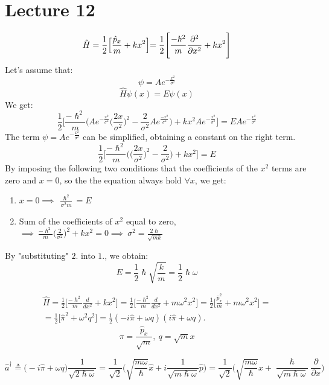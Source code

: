 \documentclass{article}
\begin{document}
\section{Lecture 12}
$$\hat{H} = \frac{1}{2} \Bigl[ \frac{\hat{p}_x}{m} + kx^2 \Bigl] = \frac{1}{2} \Biggl[ \frac{-\hslash^2}{m} \frac{\partial^2}{\partial x^2}+ kx^2 \Biggl] $$
Let's assume that:
$$ \psi = Ae^{-\frac{x^2}{\sigma^2}}$$
$$\hat{H}\psi(x) = E\psi(x)$$
We get:
$$\frac{1}{2} \Biggl[ \frac{-\hslash^2}{m} \Biggl( Ae^{-\frac{x^2}{\sigma^2}}\biggl( \frac{2x}{\sigma^2}\biggl)^2 - \frac{2}{\sigma^2} Ae^{\frac{-x^2}{\sigma^2}} \Biggl) + kx^2Ae^{-\frac{x^2}{\sigma^2}}\Biggl] = EAe^{-\frac{x^2}{\sigma^2}}$$
The term $\psi = Ae^{-\frac{x^2}{\sigma^2}} $ can be simplified, obtaining a constant on the right term.
$$\frac{1}{2} \Biggl[ \frac{-\hslash^2}{m} \Biggl(\biggl( \frac{2x}{\sigma^2}\biggl)^2 - \frac{2}{\sigma^2} \Biggl) + kx^2\Biggl] = E$$
By imposing  the following two conditions that the coefficients of the $x^2$ terms are zero and $x=0 $, so the the equation always hold $\forall x$, we get:
\begin{enumerate}
    \item $  x = 0 \implies \ \frac{\hslash^2 }{\sigma^2 m} = E $
    \item Sum of the coefficients of $x^2$ equal to zero, $ \implies \ \frac{-\hslash^2}{m}\Biggl(\frac{2}{\sigma^2}\Biggl)^2+ kx^2 = 0 \implies \ \sigma^2 =  \frac{2 \hslash}{\sqrt{mk}}$
\end{enumerate}
By "substituting" $2.$ into $1.$, we obtain:
$$E = \frac{1}{2}\hslash\sqrt{\frac{k}{m}} = \frac{1}{2}\hslash \omega$$

\begin{gather*}
    \hat{H} = \frac{1}{2}\Biggl[ \frac{-\hslash^2}{m}\frac{d}{dx^2}+kx^2 \Biggl] =\frac{1}{2}\Biggl[ \frac{-\hslash^2}{m}\frac{d}{dx^2}+m\omega^2x^2 \Biggl] = \frac{1}{2} \Biggl[ \frac{\hat{p}_x^2}{m} + m\omega^2 x^2 \Biggl] = \\ = \frac{1}{2} \Biggl[ \hat{\pi}^2 + \omega^2 q^2 \Biggl] = \frac{1}{2}(-i \hat{\pi}+\omega q)(i \hat{\pi}+\omega q).
\end{gather*}
$$\pi = \frac{\hat{p}_x}{\sqrt{m}},\ q = \sqrt{m}x$$


$$\hat{a}^{\dag} \triangleq \bigl( -i\hat{\pi} + \omega q \bigl) \frac{1}{\sqrt{2\hslash\omega}} = \frac{1}{\sqrt{2}} \biggl( \sqrt{\frac{m\omega}{\hslash}}\hat{x}+ i \frac{1}{\sqrt{m\hslash\omega}} \hat{p} \biggl) = \frac{1}{\sqrt{2}} \biggl( \sqrt{\frac{m\omega}{\hslash}}x+  \frac{\hslash}{\sqrt{m\hslash\omega}}  \frac{\partial }{\partial x}\biggl)  $$
    
\end{document}
